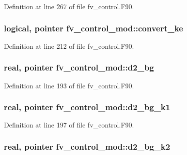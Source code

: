 Definition at line 267 of file fv\-\_\-control.\-F90.

\subsubsection[{convert\-\_\-ke}]{\setlength{\rightskip}{0pt plus 5cm}logical, pointer fv\-\_\-control\-\_\-mod\-::convert\-\_\-ke\hspace{0.3cm}{\ttfamily [private]}}\label{classfv__control__mod_ad752cc0b235be8111c1e0535ee4ab5be}


Definition at line 212 of file fv\-\_\-control.\-F90.

\subsubsection[{d2\-\_\-bg}]{\setlength{\rightskip}{0pt plus 5cm}real, pointer fv\-\_\-control\-\_\-mod\-::d2\-\_\-bg\hspace{0.3cm}{\ttfamily [private]}}\label{classfv__control__mod_adf2af616e47d9f38418179eaf0eb84aa}


Definition at line 193 of file fv\-\_\-control.\-F90.

\subsubsection[{d2\-\_\-bg\-\_\-k1}]{\setlength{\rightskip}{0pt plus 5cm}real, pointer fv\-\_\-control\-\_\-mod\-::d2\-\_\-bg\-\_\-k1\hspace{0.3cm}{\ttfamily [private]}}\label{classfv__control__mod_ae8d918b4d99a7e2fc1d25041ab7d99a1}


Definition at line 197 of file fv\-\_\-control.\-F90.

\subsubsection[{d2\-\_\-bg\-\_\-k2}]{\setlength{\rightskip}{0pt plus 5cm}real, pointer fv\-\_\-control\-\_\-mod\-::d2\-\_\-bg\-\_\-k2\hspace{0.3cm}{\ttfamily [private]}}\label{classfv__control__mod_a216ec767e61e174cefa24dc5762f234c}



